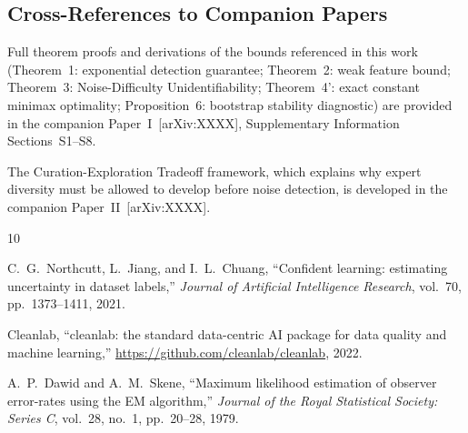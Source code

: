 \documentclass[11pt,a4paper]{article}
\begin{document}
\subsection{Cross-References to Companion Papers}

Full theorem proofs and derivations of the bounds referenced in this work (Theorem~1: exponential detection guarantee; Theorem~2: weak feature bound; Theorem~3: Noise-Difficulty Unidentifiability; Theorem~4': exact constant minimax optimality; Proposition~6: bootstrap stability diagnostic) are provided in the companion Paper~I~[arXiv:XXXX], Supplementary Information Sections~S1--S8.

The Curation-Exploration Tradeoff framework, which explains why expert diversity must be allowed to develop before noise detection, is developed in the companion Paper~II~[arXiv:XXXX].

\begin{thebibliography}{10}

C.~G.~Northcutt, L.~Jiang, and I.~L.~Chuang, ``Confident learning: estimating uncertainty in dataset labels,'' \textit{Journal of Artificial Intelligence Research}, vol.~70, pp.~1373--1411, 2021.

Cleanlab, ``cleanlab: the standard data-centric AI package for data quality and machine learning,'' \url{https://github.com/cleanlab/cleanlab}, 2022.

A.~P.~Dawid and A.~M.~Skene, ``Maximum likelihood estimation of observer error-rates using the EM algorithm,'' \textit{Journal of the Royal Statistical Society: Series C}, vol.~28, no.~1, pp.~20--28, 1979.

\end{thebibliography}
\end{document}
